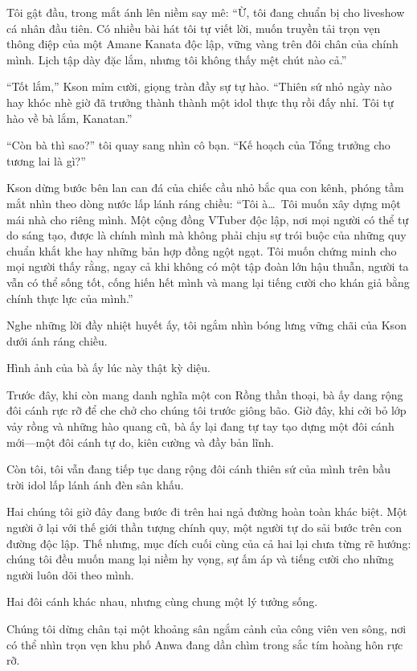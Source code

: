 \documentclass[../main.tex]{subfiles}
\begin{document}
Tôi gật đầu, trong mắt ánh lên niềm say mê: ``Ừ, tôi đang chuẩn bị cho liveshow cá nhân đầu tiên. Có nhiều bài hát tôi tự viết lời, muốn truyền tải trọn vẹn thông điệp của một Amane Kanata độc lập, vững vàng trên đôi chân của chính mình. Lịch tập dày đặc lắm, nhưng tôi không thấy mệt chút nào cả.''

``Tốt lắm,'' Kson mỉm cười, giọng tràn đầy sự tự hào. ``Thiên sứ nhỏ ngày nào hay khóc nhè giờ đã trưởng thành thành một idol thực thụ rồi đấy nhỉ. Tôi tự hào về bà lắm, Kanatan.''

``Còn bà thì sao?'' tôi quay sang nhìn cô bạn. ``Kế hoạch của Tổng trưởng cho tương lai là gì?''

Kson dừng bước bên lan can đá của chiếc cầu nhỏ bắc qua con kênh, phóng tầm mắt nhìn theo dòng nước lấp lánh ráng chiều: ``Tôi à\dots\ Tôi muốn xây dựng một mái nhà cho riêng mình. Một cộng đồng VTuber độc lập, nơi mọi người có thể tự do sáng tạo, được là chính mình mà không phải chịu sự trói buộc của những quy chuẩn khắt khe hay những bản hợp đồng ngột ngạt. Tôi muốn chứng minh cho mọi người thấy rằng, ngay cả khi không có một tập đoàn lớn hậu thuẫn, người ta vẫn có thể sống tốt, cống hiến hết mình và mang lại tiếng cười cho khán giả bằng chính thực lực của mình.''

Nghe những lời đầy nhiệt huyết ấy, tôi ngắm nhìn bóng lưng vững chãi của Kson dưới ánh ráng chiều.

Hình ảnh của bà ấy lúc này thật kỳ diệu.

Trước đây, khi còn mang danh nghĩa một con Rồng thần thoại, bà ấy dang rộng đôi cánh rực rỡ để che chở cho chúng tôi trước giông bão. Giờ đây, khi cởi bỏ lớp vảy rồng và những hào quang cũ, bà ấy lại đang tự tay tạo dựng một đôi cánh mới—một đôi cánh tự do, kiên cường và đầy bản lĩnh.

Còn tôi, tôi vẫn đang tiếp tục dang rộng đôi cánh thiên sứ của mình trên bầu trời idol lấp lánh ánh đèn sân khấu.

Hai chúng tôi giờ đây đang bước đi trên hai ngả đường hoàn toàn khác biệt. Một người ở lại với thế giới thần tượng chính quy, một người tự do sải bước trên con đường độc lập. Thế nhưng, mục đích cuối cùng của cả hai lại chưa từng rẽ hướng: chúng tôi đều muốn mang lại niềm hy vọng, sự ấm áp và tiếng cười cho những người luôn dõi theo mình.

Hai đôi cánh khác nhau, nhưng cùng chung một lý tưởng sống.

\ct

Chúng tôi dừng chân tại một khoảng sân ngắm cảnh của công viên ven sông, nơi có thể nhìn trọn vẹn khu phố Anwa đang dần chìm trong sắc tím hoàng hôn rực rỡ.
\end{document}
